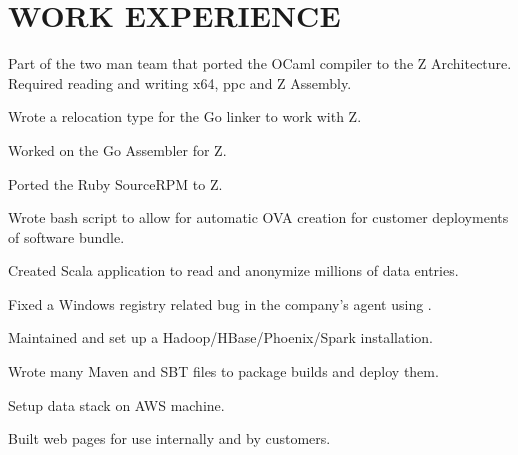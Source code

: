 \documentclass[letterpaper]{deedy-resume-modified} %
\begin{document}
\begin{minipage}[t]{0.66\textwidth} %
\vspace{16pt}

\section{WORK EXPERIENCE}


\vspace{\topsep}
\begin{tightitemize}
\item Part of the two man team that ported the OCaml compiler to the Z Architecture. Required reading and writing x64, ppc and Z Assembly.
\item Wrote a relocation type for the Go linker to work with Z.
\item Worked on the Go Assembler for Z.
\item Ported the Ruby SourceRPM to Z.
\end{tightitemize}

\sectionspace %



\begin{tightitemize}
\item Wrote bash script to allow for automatic OVA creation for customer deployments of software bundle.
\item Created Scala application to read and anonymize millions of data entries.
\item Fixed a Windows registry related bug in the company's agent using \CPP.
\item Maintained and set up a Hadoop/HBase/Phoenix/Spark installation.
\item Wrote many Maven and SBT files to package builds and deploy them.
\item Setup data stack on AWS machine.
\item Built web pages for use internally and by customers.
\end{tightitemize}


\end{minipage}
\end{document}
